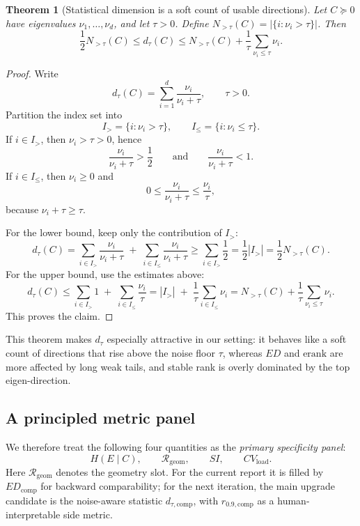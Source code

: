 \documentclass[11pt]{article}
\newtheorem{theorem}{Theorem}
\begin{document}
\begin{theorem}[Statistical dimension is a soft count of usable directions]
Let $C\succeq 0$ have eigenvalues $\nu_1,\dots,\nu_d$, and let $\tau>0$. Define $N_{>\tau}(C)=|\{i:\nu_i>\tau\}|$. Then
\[
\frac{1}{2}N_{>\tau}(C)
\le
d_\tau(C)
\le
N_{>\tau}(C) + \frac{1}{\tau}\sum_{\nu_i\le \tau}\nu_i.
\]
\end{theorem}

\begin{proof}
Write
\[
d_\tau(C)=\sum_{i=1}^d \frac{\nu_i}{\nu_i+\tau},
\qquad \tau>0.
\]
Partition the index set into
\[
I_> = \{i:\nu_i>\tau\},
\qquad
I_{\le} = \{i:\nu_i\le\tau\}.
\]
If $i\in I_>$, then $\nu_i>\tau>0$, hence
\[
\frac{\nu_i}{\nu_i+\tau}>\frac{1}{2}
\qquad\text{and}\qquad
\frac{\nu_i}{\nu_i+\tau}<1.
\]
If $i\in I_{\le}$, then $\nu_i\ge 0$ and
\[
0\le \frac{\nu_i}{\nu_i+\tau}\le \frac{\nu_i}{\tau},
\]
because $\nu_i+\tau\ge\tau$.

For the lower bound, keep only the contribution of $I_>$:
\[
d_\tau(C)
=
\sum_{i\in I_>} \frac{\nu_i}{\nu_i+\tau}
\;+\;
\sum_{i\in I_{\le}} \frac{\nu_i}{\nu_i+\tau}
\ge
\sum_{i\in I_>} \frac{1}{2}
=
\frac{1}{2}|I_>|
=
\frac{1}{2}N_{>\tau}(C).
\]
For the upper bound, use the estimates above:
\[
d_\tau(C)
\le
\sum_{i\in I_>} 1
\;+\;
\sum_{i\in I_{\le}} \frac{\nu_i}{\tau}
=
|I_>|
\;+\;
\frac{1}{\tau}\sum_{i\in I_{\le}}\nu_i
=
N_{>\tau}(C)+\frac{1}{\tau}\sum_{\nu_i\le\tau}\nu_i.
\]
This proves the claim.
\end{proof}

This theorem makes $d_\tau$ especially attractive in our setting: it behaves like a soft count of directions that rise above the noise floor $\tau$, whereas $ED$ and $\mathrm{erank}$ are more affected by long weak tails, and stable rank is overly dominated by the top eigen-direction.

\subsection{A principled metric panel}
We therefore treat the following four quantities as the \emph{primary specificity panel}:
\[
H(E\mid C),\qquad
\mathcal{R}_{\mathrm{geom}},\qquad
SI,\qquad
CV_{\mathrm{load}}.
\]
Here $\mathcal{R}_{\mathrm{geom}}$ denotes the geometry slot. For the current report it is filled by $ED_{\mathrm{comp}}$ for backward comparability; for the next iteration, the main upgrade candidate is the noise-aware statistic $d_{\tau,\mathrm{comp}}$, with $r_{0.9,\mathrm{comp}}$ as a human-interpretable side metric.
\end{document}
